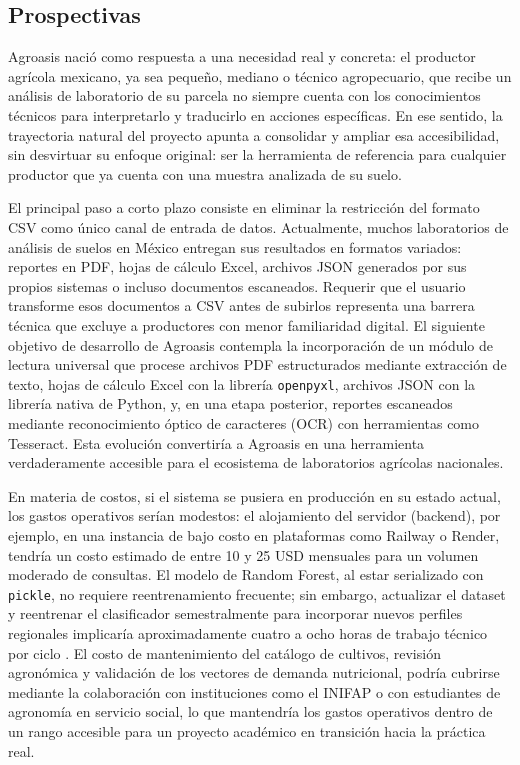 \documentclass[12pt]{article}
\begin{document}
\subsection{Prospectivas}

Agroasis nació como respuesta a una necesidad real y concreta: el productor agrícola mexicano, ya sea pequeño, mediano o técnico agropecuario, que recibe un análisis de laboratorio de su parcela no siempre cuenta con los conocimientos técnicos para interpretarlo y traducirlo en acciones específicas. En ese sentido, la trayectoria natural del proyecto apunta a consolidar y ampliar esa accesibilidad, sin desvirtuar su enfoque original: ser la herramienta de referencia para cualquier productor que ya cuenta con una muestra analizada de su suelo.

El principal paso a corto plazo consiste en eliminar la restricción del formato CSV como único canal de entrada de datos. Actualmente, muchos laboratorios de análisis de suelos en México entregan sus resultados en formatos variados: reportes en PDF, hojas de cálculo Excel, archivos JSON generados por sus propios sistemas o incluso documentos escaneados. Requerir que el usuario transforme esos documentos a CSV antes de subirlos representa una barrera técnica que excluye a productores con menor familiaridad digital. El siguiente objetivo de desarrollo de Agroasis contempla la incorporación de un módulo de lectura universal que procese archivos PDF estructurados mediante extracción de texto, hojas de cálculo Excel con la librería \texttt{openpyxl}, archivos JSON con la librería nativa de Python, y, en una etapa posterior, reportes escaneados mediante reconocimiento óptico de caracteres (OCR) con herramientas como Tesseract. Esta evolución convertiría a Agroasis en una herramienta verdaderamente accesible para el ecosistema de laboratorios agrícolas nacionales.

En materia de costos, si el sistema se pusiera en producción en su estado actual, los gastos operativos serían modestos: el alojamiento del servidor (backend), por ejemplo, en una instancia de bajo costo en plataformas como Railway o Render, tendría un costo estimado de entre 10 y 25 USD mensuales para un volumen moderado de consultas. El modelo de Random Forest, al estar serializado con \texttt{pickle}, no requiere reentrenamiento frecuente; sin embargo, actualizar el dataset y reentrenar el clasificador semestralmente para incorporar nuevos perfiles regionales implicaría aproximadamente cuatro a ocho horas de trabajo técnico por ciclo \citep{breiman_2001}. El costo de mantenimiento del catálogo de cultivos, revisión agronómica y validación de los vectores de demanda nutricional, podría cubrirse mediante la colaboración con instituciones como el INIFAP \citep{inifap_2019} o con estudiantes de agronomía en servicio social, lo que mantendría los gastos operativos dentro de un rango accesible para un proyecto académico en transición hacia la práctica real.
\end{document}
